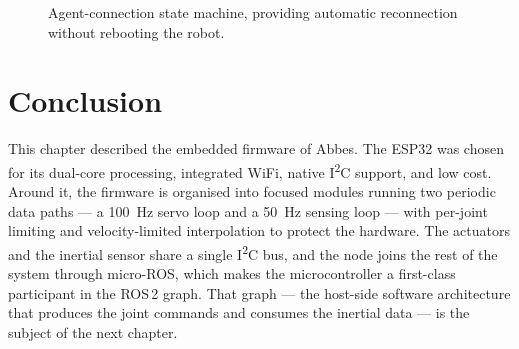 \begin{figure}[ht]
  \centering
  \caption{Agent-connection state machine, providing automatic
           reconnection without rebooting the robot.}
  \label{fig:fsm}
\end{figure}

\section{Conclusion}
This chapter described the embedded firmware of Abbes. The ESP32 was
chosen for its dual-core processing, integrated WiFi, native
I\textsuperscript{2}C support, and low cost. Around it, the firmware is
organised into focused modules running two periodic data paths --- a
100~Hz servo loop and a 50~Hz sensing loop --- with per-joint limiting
and velocity-limited interpolation to protect the hardware. The actuators
and the inertial sensor share a single I\textsuperscript{2}C bus, and the
node joins the rest of the system through micro-ROS, which makes the
microcontroller a first-class participant in the ROS\,2 graph. That graph
--- the host-side software architecture that produces the joint commands
and consumes the inertial data --- is the subject of the next chapter.
